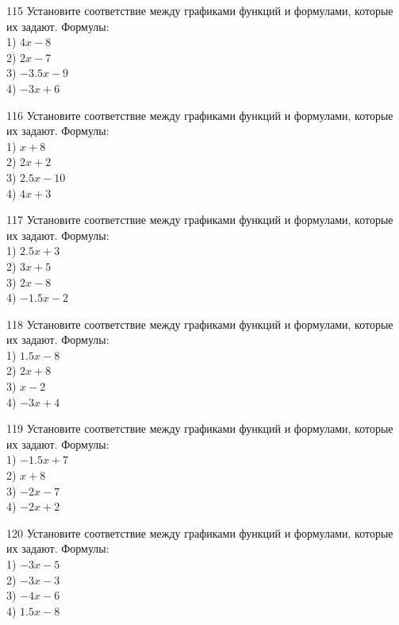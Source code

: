 \documentclass[4apaper]{article}
\begin{document}
\begin{taskBN}{115}
Установите соответствие между графиками функций и формулами, которые их задают. Формулы: \\1) $4x-8$\\2) $2x-7$\\3) $-3.5x-9$\\4) $-3x+6$
\end{taskBN}

\begin{taskBN}{116}
Установите соответствие между графиками функций и формулами, которые их задают. Формулы: \\1) $x+8$\\2) $2x+2$\\3) $2.5x-10$\\4) $4x+3$
\end{taskBN}

\begin{taskBN}{117}
Установите соответствие между графиками функций и формулами, которые их задают. Формулы: \\1) $2.5x+3$\\2) $3x+5$\\3) $2x-8$\\4) $-1.5x-2$
\end{taskBN}

\begin{taskBN}{118}
Установите соответствие между графиками функций и формулами, которые их задают. Формулы: \\1) $1.5x-8$\\2) $2x+8$\\3) $x-2$\\4) $-3x+4$
\end{taskBN}

\begin{taskBN}{119}
Установите соответствие между графиками функций и формулами, которые их задают. Формулы: \\1) $-1.5x+7$\\2) $x+8$\\3) $-2x-7$\\4) $-2x+2$
\end{taskBN}

\begin{taskBN}{120}
Установите соответствие между графиками функций и формулами, которые их задают. Формулы: \\1) $-3x-5$\\2) $-3x-3$\\3) $-4x-6$\\4) $1.5x-8$
\end{taskBN}
\end{document}
